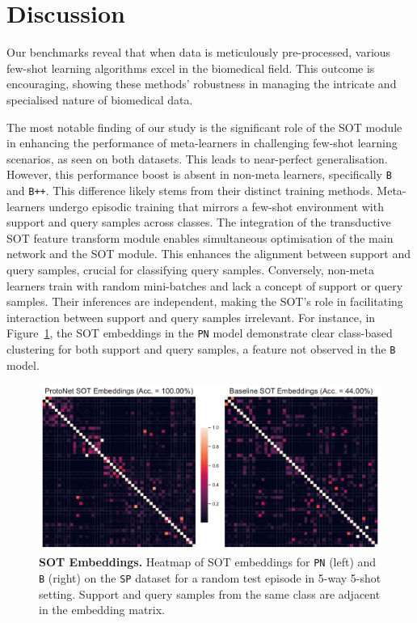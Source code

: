 \section{Discussion}

Our benchmarks reveal that when data is meticulously pre-processed, various few-shot learning algorithms excel in the biomedical field. This outcome is encouraging, showing these methods' robustness in managing the intricate and specialised nature of biomedical data.

The most notable finding of our study is the significant role of the SOT module in enhancing the performance of meta-learners in challenging few-shot learning scenarios, as seen on both datasets. This leads to near-perfect generalisation. However, this performance boost is absent in non-meta learners, specifically \texttt{B} and \texttt{B++}. This difference likely stems from their distinct training methods. Meta-learners undergo episodic training that mirrors a few-shot environment with support and query samples across classes. The integration of the transductive SOT feature transform module enables simultaneous optimisation of the main network and the SOT module. This enhances the alignment between support and query samples, crucial for classifying query samples. Conversely, non-meta learners train with random mini-batches and lack a concept of support or query samples. Their inferences are independent, making the SOT's role in facilitating interaction between support and query samples irrelevant. For instance, in Figure~\ref{fig:sot-embeddings}, the SOT embeddings in the \texttt{PN} model demonstrate clear class-based clustering for both support and query samples, a feature not observed in the \texttt{B} model.

\begin{figure}[h!]
    \centering
    \includegraphics[width=1\columnwidth]{../figures/sot-embeddings.pdf}
    \caption{\textbf{SOT Embeddings.} Heatmap of SOT embeddings for \texttt{PN} (left) and \texttt{B} (right) on the \texttt{SP} dataset for a random test episode in 5-way 5-shot setting. Support and query samples from the same class are adjacent in the embedding matrix.}
    \label{fig:sot-embeddings}
\end{figure}

